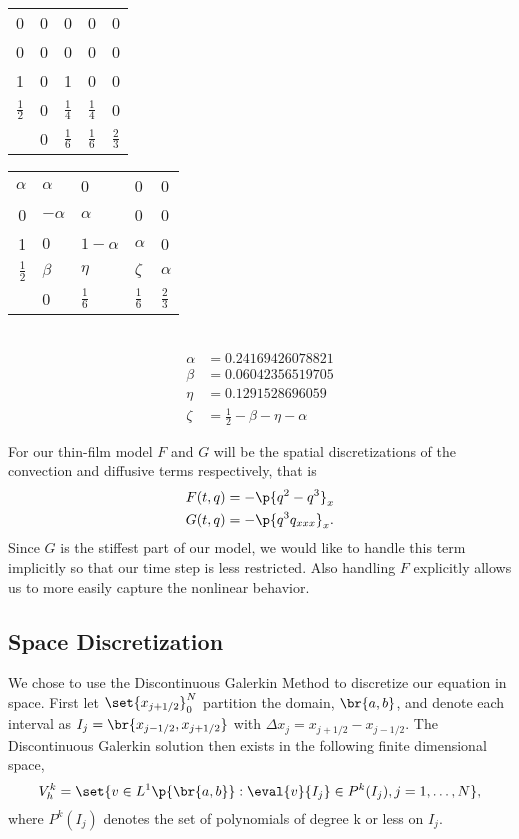 \begin{center}
  \begin{tabular}{r|llll}
    0 & 0 & 0 & 0 & 0 \\
    0 & 0 & 0 & 0 & 0 \\
    1 & 0 & 1 & 0 & 0 \\
    \(\frac{1}{2}\) & 0 & \(\frac{1}{4}\) & \(\frac{1}{4}\) & 0 \\
    \midrule
      & 0 & \(\frac{1}{6}\) & \(\frac{1}{6}\) & \(\frac{2}{3}\) \\
  \end{tabular} \hspace{0.5cm}
  \begin{tabular}{r|llll}
    \(\alpha \) & \(\alpha \) & 0 & 0 & 0 \\
    0 & \(-\alpha \) & \(\alpha \) & 0 & 0 \\
    1 & \(0\) & \(1 - \alpha \) & \(\alpha \) & 0 \\
    \(\frac{1}{2}\) & \(\beta \) & \(\eta \) & \(\zeta \) & \(\alpha \) \\
    \midrule
      & 0 & \(\frac{1}{6}\) & \(\frac{1}{6}\) & \(\frac{2}{3}\) \\
  \end{tabular} \\
  \begin{align*}
    \alpha &= 0.24169426078821 \\
    \beta &= 0.06042356519705 \\
    \eta &= 0.1291528696059 \\
    \zeta &= \frac{1}{2} - \beta - \eta - \alpha
  \end{align*}
\end{center}

For our thin-film model \(F\) and \(G\) will be the spatial discretizations of
the convection and diffusive terms respectively, that is
\begin{align}
  F(t, q) &= -\p{q^2 - q^3}_x \\
  G(t, q) &= -\p{q^3 q_{xxx}}_x.
\end{align}
Since \(G\) is the stiffest part of our model, we would like to handle this term
implicitly so that our time step is less restricted.
Also handling \(F\) explicitly allows us to more easily capture the nonlinear
behavior.

\subsection{Space Discretization}
We chose to use the Discontinuous Galerkin Method to discretize our equation in
space.
First let \(\set{x_{j+1/2}}_0^N\) partition the domain, \(\br{a, b}\), and denote
each interval as \(I_j = \br{x_{j-1/2}, x_{j+1/2}}\) with
\(\Delta x_j = x_{j+1/2} - x_{j-1/2}\).
The Discontinuous Galerkin solution then exists in the following finite dimensional
space,
\begin{equation}
  V_h^k = \set{v \in L^1\p{\br{a, b}}: \eval{v}{I_j} \in P^k(I_j), j = 1, \ldots, N},
\end{equation}
where \(P^k(I_j)\) denotes the set of polynomials of degree k or less on \(I_j\).


